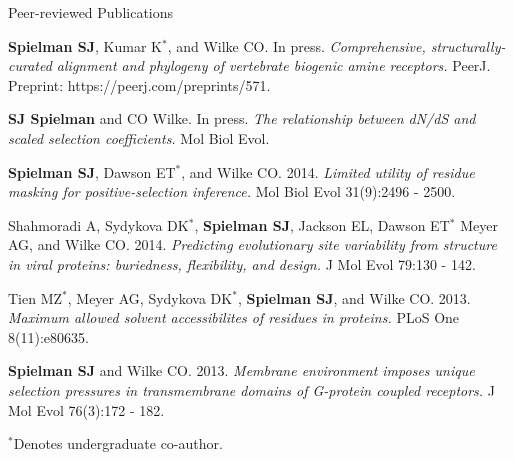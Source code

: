 \documentclass{resume} %
\begin{document}
\vspace*{0.5cm}
\begin{rSection}{Peer-reviewed Publications}
\vspace*{0.25cm}

\begin{etaremune}[leftmargin=1.5em]
	
\item \textbf{Spielman SJ}, Kumar K$^\ast$, and Wilke CO. In press. \emph{Comprehensive, structurally-curated alignment and phylogeny of vertebrate biogenic amine receptors.} PeerJ. Preprint: https://peerj.com/preprints/571. \\ 


\item \textbf{SJ Spielman} and CO Wilke. In press. \emph{The relationship between dN/dS and scaled selection coefficients.} Mol Biol Evol. \\

\item \textbf{Spielman SJ}, Dawson ET$^\ast$, and Wilke CO. 2014. \emph{Limited utility of residue masking for positive-selection inference.} Mol Biol Evol 31(9):2496 - 2500. \\


\item Shahmoradi A, Sydykova DK$^\ast$, \textbf{Spielman SJ}, Jackson EL, Dawson ET$^\ast$ Meyer AG, and Wilke CO. 2014. \emph{Predicting evolutionary site variability from structure in viral proteins: buriedness, flexibility, and design.} J Mol Evol 79:130 - 142. \\


\item Tien MZ$^\ast$, Meyer AG, Sydykova DK$^\ast$, \textbf{Spielman SJ}, and Wilke CO. 2013. \emph{Maximum allowed solvent accessibilites of residues in proteins.} PLoS One 8(11):e80635. \\


\item \textbf{Spielman SJ} and Wilke CO. 2013. \emph{Membrane environment imposes unique selection pressures in transmembrane domains of G-protein coupled receptors.} J Mol Evol 76(3):172 - 182. \\

\end{etaremune}

$^\ast$Denotes undergraduate co-author.


\end{rSection}
\end{document}
